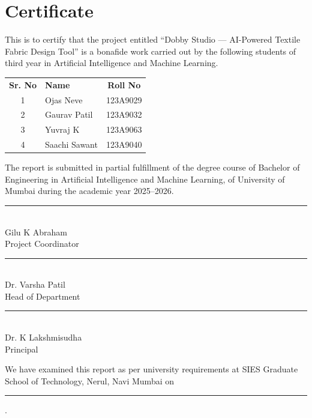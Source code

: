 \chapter*{Certificate}
\vspace{0.5cm}

This is to certify that the project entitled ``Dobby Studio — AI-Powered Textile Fabric Design Tool'' is a bonafide work carried out by the following students of third year in Artificial Intelligence and Machine Learning.

\vspace{0.5cm}
\begin{center}
\begin{tabular}{clc}
    \textbf{Sr. No} & \textbf{Name} & \textbf{Roll No} \\ [4pt]
    1 & Ojas Neve & 123A9029 \\ [4pt]
    2 & Gaurav Patil & 123A9032 \\ [4pt]
    3 & Yuvraj K & 123A9063 \\ [4pt]
    4 & Saachi Sawant & 123A9040 \\
\end{tabular}
\end{center}
\vspace{0.5cm}

The report is submitted in partial fulfillment of the degree course of Bachelor of Engineering in Artificial Intelligence and Machine Learning, of University of Mumbai during the academic year 2025–2026.

\vspace{1.5cm}

\vspace{1.5cm}

\noindent
\begin{minipage}{0.32\textwidth}
    \centering
    \rule{4.5cm}{0.5pt} \\
    Gilu K Abraham \\
    Project Coordinator
\end{minipage}
\hfill
\begin{minipage}{0.32\textwidth}
    \centering
    \rule{4.5cm}{0.5pt} \\
    Dr. Varsha Patil \\
    Head of Department
\end{minipage}
\hfill
\begin{minipage}{0.32\textwidth}
    \centering
    \rule{4.5cm}{0.5pt} \\
    Dr. K Lakshmisudha \\
    Principal
\end{minipage}



\vspace{1.5cm}

\noindent
We have examined this report as per university requirements at SIES Graduate School of Technology, Nerul, Navi Mumbai on \rule{4cm}{0.5pt}.

